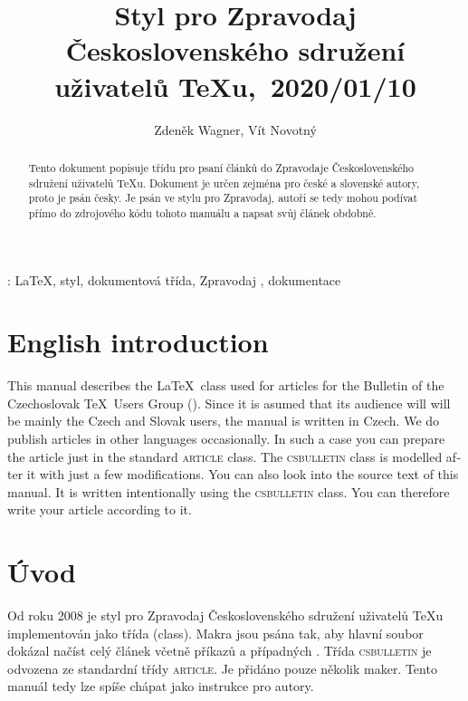 \documentclass{csbulletin}
\DeclareRobustCommand\version{\unskip~2020/01/10}
\let\pkg\textsc
\begin{document}
\title{Styl pro Zpravodaj Československého sdružení uživatelů \TeX{}u,\version}
\EnglishTitle{\LaTeX\ Class for \CSTUG\ Bulletin,\version}
\author{Zdeněk Wagner, Vít Novotný}
\maketitle

\begin{abstract}
Tento dokument popisuje třídu pro psaní článků do Zpravodaje Československého sdružení uživatelů
\TeX{}u. Dokument je určen zejména pro české a slovenské autory, proto je psán česky. Je psán 
ve stylu pro Zpravodaj, autoři se tedy mohou podívat přímo do zdrojového kódu tohoto manuálu a
napsat svůj článek obdobně.
\end{abstract}
\klicovaslova: \LaTeX, styl, dokumentová třída, Zpravodaj \CSTUG, dokumentace

\section{English introduction}
\begin{otherlanguage}{english}
This manual describes the \LaTeX\ class used for articles for the Bulletin of the Czechoslovak
\TeX\ Users Group (\cstug). Since it is asumed that its audience will will be mainly the Czech and
Slovak users, the manual is written in Czech. We do publish articles in other languages
occasionally. In such a case you can prepare the article just in the standard \pkg{article} class.
The \pkg{csbulletin} class is modelled after it with just a few modifications. You can also look
into the source text of this manual. It is written intentionally using the \pkg{csbulletin} class.
You can therefore write your article according to it.
\end{otherlanguage}

\section{Úvod}
Od roku 2008 je styl pro Zpravodaj Československého sdružení uživatelů \TeX{}u implementován jako
třída (class). Makra jsou psána tak, aby hlavní soubor dokázal načíst celý článek včetně příkazů
 a případných . Třída \pkg{csbulletin} je odvozena ze standardní
třídy \pkg{article}. Je přidáno pouze několik maker. Tento manuál tedy lze spíše chápat jako
instrukce pro autory.
\end{document}
